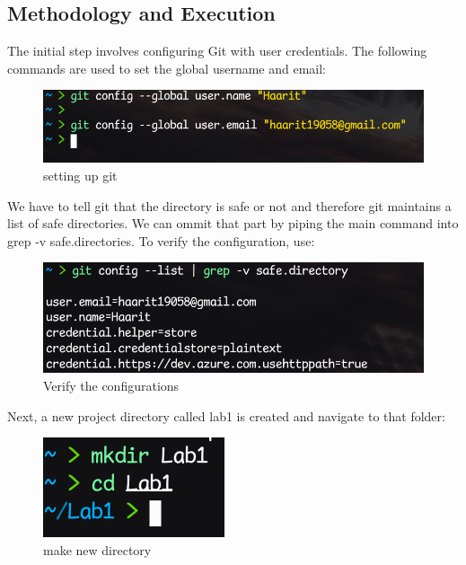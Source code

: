 \documentclass[a4paper,12pt,twoside,english]{all-in-one} %
\begin{document}
\subsection{Methodology and Execution}

The initial step involves configuring Git with user credentials. The following commands are used to set the global username and email:

\begin{figure}[H]
    \centering
    \includegraphics[width=0.75\linewidth]{image01.png}
    \caption{setting up git}
    \label{fig:placeholder}
\end{figure}

We have to tell git that the directory is safe or not and therefore git maintains a list of safe directories. We can ommit that part by piping the main command into grep -v safe.directories.
To verify the configuration, use:
\begin{figure}[H]
    \centering
    \includegraphics[width=0.75\linewidth]{image02.png}
    \caption{Verify the configurations}
    \label{fig:placeholder}
\end{figure}


Next, a new project directory called lab1 is created and navigate to that folder:
\begin{figure}[H]
    \centering
    \includegraphics[width=0.4\linewidth]{image03.png}
    \caption{make new directory}
    \label{fig:placeholder}
\end{figure}
\end{document}
